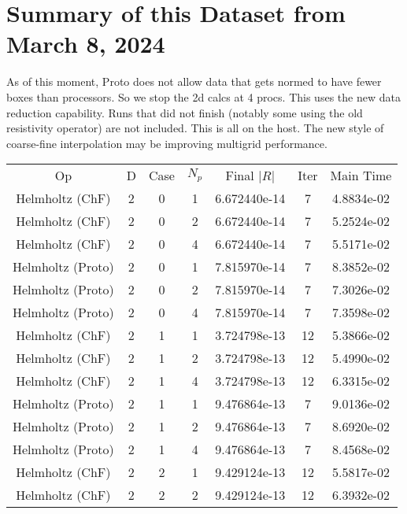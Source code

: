 \documentclass{article}
\begin{document}
\section{Summary of this Dataset from March 8, 2024}

As of this moment, Proto does not allow data that gets normed to have
fewer boxes than processors.  So we stop the 2d calcs at 4 procs.
This uses the new data reduction capability.  Runs that did not finish
(notably some using the old resistivity operator) are not included.
This is all on the host.  The new style of coarse-fine interpolation
may be improving multigrid performance.  

\begin{small}
\begin{table} 
  \begin{center}
    \begin{tabular}{|c|c|c|c|c|c||c|} \hline 
      Op & D & Case & $N_p$ & Final $|R|$  &  Iter & Main Time \\  
      Helmholtz       (ChF) & 2 & 0 & 1& 6.672440e-14 & 7 & 4.8834e-02\\
      Helmholtz       (ChF) & 2 & 0 & 2& 6.672440e-14 & 7 & 5.2524e-02\\
      Helmholtz       (ChF) & 2 & 0 & 4& 6.672440e-14 & 7 & 5.5171e-02\\
      Helmholtz     (Proto) & 2 & 0 & 1& 7.815970e-14 & 7 & 8.3852e-02\\
      Helmholtz     (Proto) & 2 & 0 & 2& 7.815970e-14 & 7 & 7.3026e-02\\
      Helmholtz     (Proto) & 2 & 0 & 4& 7.815970e-14 & 7 & 7.3598e-02\\
      \hline 
      Helmholtz       (ChF) & 2 & 1 & 1& 3.724798e-13 & 12 & 5.3866e-02\\
      Helmholtz       (ChF) & 2 & 1 & 2& 3.724798e-13 & 12 & 5.4990e-02\\
      Helmholtz       (ChF) & 2 & 1 & 4& 3.724798e-13 & 12 & 6.3315e-02\\
      Helmholtz     (Proto) & 2 & 1 & 1& 9.476864e-13 & 7 & 9.0136e-02\\
      Helmholtz     (Proto) & 2 & 1 & 2& 9.476864e-13 & 7 & 8.6920e-02\\
      Helmholtz     (Proto) & 2 & 1 & 4& 9.476864e-13 & 7 & 8.4568e-02\\
      \hline 
      Helmholtz       (ChF) & 2 & 2 & 1& 9.429124e-13 & 12 & 5.5817e-02\\
      Helmholtz       (ChF) & 2 & 2 & 2& 9.429124e-13 & 12 & 6.3932e-02\\

\end{tabular}
\end{center}
\end{table}
\end{small}
\end{document}
